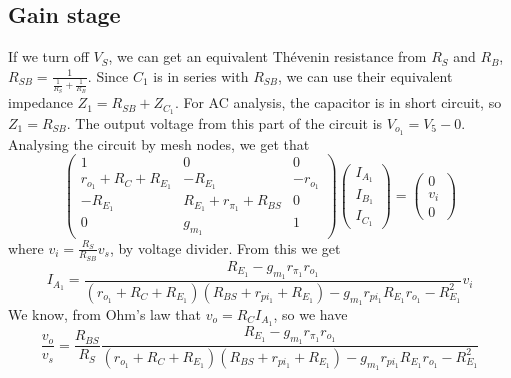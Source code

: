 \subsection{Gain stage}
If we turn off $V_S$, we can get an equivalent Thévenin resistance from $R_S$ and $R_B$, $R_{SB}=\frac{1}{\frac{1}{R_S}+\frac{1}{R_B}}$. Since $C_1$ is in series with $R_{SB}$, we can use their equivalent impedance $Z_1=R_{SB}+Z_{C_1}$. For AC analysis, the capacitor is in short circuit, so $Z_1=R_{SB}$.  The output voltage from this part of the circuit is $V_{o_1}=V_5-0$. Analysing the circuit by mesh nodes, we get that 
\begin{equation}
\left(\begin{array}{ccccc} 1 & 0 & 0 \\ r_{o_1}+R_C+R_{E_1} & -R_{E_1} & -r_{o_1}\\
-R_{E_1} & R_{E_1}+r_{\pi_1}+R_{BS} & 0\\ 0 & g_{m_1} & 1
\end{array}\right)
\left(\begin{array}{c} I_{A_1} \\ I_{B_1} \\ I_{C_1}  \end{array}\right) 
= \left(\begin{array}{c}  0 \\ v_i \\0 \end{array}\right)
\end{equation}
where $v_i=\frac{R_S}{R_{SB}}v_s$, by voltage divider.
From this we get
\begin{equation}
    I_{A_1}=\frac{R_{E_1}-g_{m_1}r_{\pi_1} r_{o_1}}{(r_{o_1}+R_C+R_{E_1})(R_{BS}+r_{pi_1}+R_{E_1})-g_{m_1}r_{pi_1}R_{E_1}r_{o_1}-R_{E_1}^2}v_i
\end{equation}
We know, from Ohm's law that $v_o=R_C I_{A_1}$, so we have
\begin{equation}
    \frac{v_o}{v_s}=\frac{R_{BS}}{R_S}\frac{R_{E_1}-g_{m_1}r_{\pi_1} r_{o_1}}{(r_{o_1}+R_C+R_{E_1})(R_{BS}+r_{pi_1}+R_{E_1})-g_{m_1}r_{pi_1}R_{E_1}r_{o_1}-R_{E_1}^2}
\end{equation}


